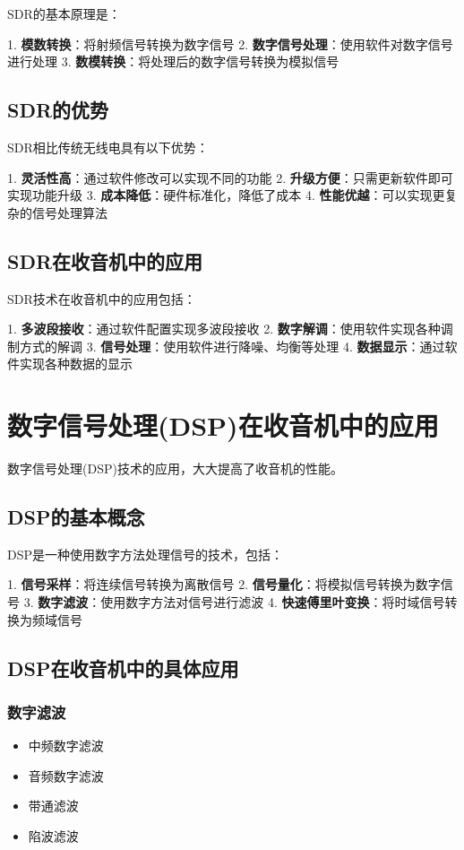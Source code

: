 \documentclass[12pt,UTF8]{ctexbook}
\begin{document}
SDR的基本原理是：

1. \textbf{模数转换}：将射频信号转换为数字信号
2. \textbf{数字信号处理}：使用软件对数字信号进行处理
3. \textbf{数模转换}：将处理后的数字信号转换为模拟信号

\section{SDR的优势}

SDR相比传统无线电具有以下优势：

1. \textbf{灵活性高}：通过软件修改可以实现不同的功能
2. \textbf{升级方便}：只需更新软件即可实现功能升级
3. \textbf{成本降低}：硬件标准化，降低了成本
4. \textbf{性能优越}：可以实现更复杂的信号处理算法

\section{SDR在收音机中的应用}

SDR技术在收音机中的应用包括：

1. \textbf{多波段接收}：通过软件配置实现多波段接收
2. \textbf{数字解调}：使用软件实现各种调制方式的解调
3. \textbf{信号处理}：使用软件进行降噪、均衡等处理
4. \textbf{数据显示}：通过软件实现各种数据的显示

\chapter{数字信号处理(DSP)在收音机中的应用}

数字信号处理(DSP)技术的应用，大大提高了收音机的性能。

\section{DSP的基本概念}

DSP是一种使用数字方法处理信号的技术，包括：

1. \textbf{信号采样}：将连续信号转换为离散信号
2. \textbf{信号量化}：将模拟信号转换为数字信号
3. \textbf{数字滤波}：使用数字方法对信号进行滤波
4. \textbf{快速傅里叶变换}：将时域信号转换为频域信号

\section{DSP在收音机中的具体应用}

\subsection{数字滤波}\begin{itemize}
  \item 中频数字滤波
  \item 音频数字滤波
  \item 带通滤波
  \item 陷波滤波\end{itemize}
\end{document}
